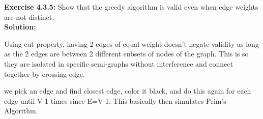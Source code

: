 \documentclass[11pt,fleqn]{article}
\begin{document}
\textbf{Exercise 4.3.5:} Show that the greedy algorithm is valid even when edge weights are not distinct.\\

\textbf{Solution:}\\

\begin{center}
	\item Using cut property, having 2 edges of equal weight doesn't negate validity as long as the 2 edges are between 2 different subsets of nodes of the graph. This is so they are isolated in specific semi-graphs without interference and connect together by crossing edge.
	\item we pick an edge and find closest edge, color it black, and do this again for each edge until V-1 times since E=V-1. This basically then simulates Prim's Algorithm.
\end{center}



	
\end{document}
